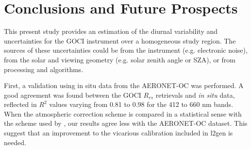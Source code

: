 \documentclass[onecolumn,3p,letterpaper,11pt]{elsarticle}
\begin{document}
\section{Conclusions and Future Prospects} 




This present study provides an estimation of the diurnal variability and uncertainties for the GOCI instrument over a homogeneous study region. 
The sources of these uncertainties could be from the instrument (e.g. electronic noise), from the solar and viewing geometry (e.g. solar zenith angle or SZA), or from processing and algorithms.

First, a validation using in situ data from the AERONET-OC was performed.
A good agreement was found between the GOCI $R_{rs}$ retrievals and {\it in situ} data, reflected in $R^2$ values varying from 0.81 to 0.98 for the 412 to 660 nm bands.
When the atmospheric correction scheme is compared in a statistical sense with the scheme used by \citet{Ahn2015}, our results agree less with the AERONET-OC dataset. 
This suggest that an improvement to the vicarious calibration included in l2gen is needed.
\end{document}

